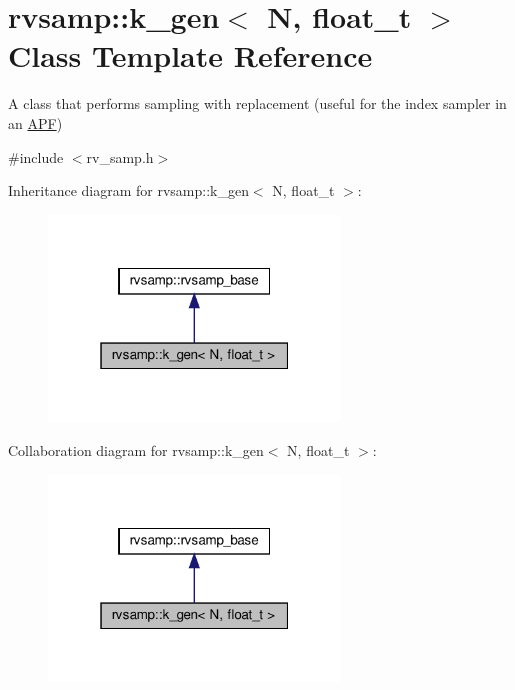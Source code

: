 \hypertarget{classrvsamp_1_1k__gen}{}\section{rvsamp\+:\+:k\+\_\+gen$<$ N, float\+\_\+t $>$ Class Template Reference}
\label{classrvsamp_1_1k__gen}


A class that performs sampling with replacement (useful for the index sampler in an \hyperlink{classAPF}{A\+PF})  




{\ttfamily \#include $<$rv\+\_\+samp.\+h$>$}



Inheritance diagram for rvsamp\+:\+:k\+\_\+gen$<$ N, float\+\_\+t $>$\+:\nopagebreak
\begin{figure}[H]
\begin{center}
\leavevmode
\includegraphics[width=220pt]{classrvsamp_1_1k__gen__inherit__graph}
\end{center}
\end{figure}


Collaboration diagram for rvsamp\+:\+:k\+\_\+gen$<$ N, float\+\_\+t $>$\+:\nopagebreak
\begin{figure}[H]
\begin{center}
\leavevmode
\includegraphics[width=220pt]{classrvsamp_1_1k__gen__coll__graph}
\end{center}
\end{figure}

